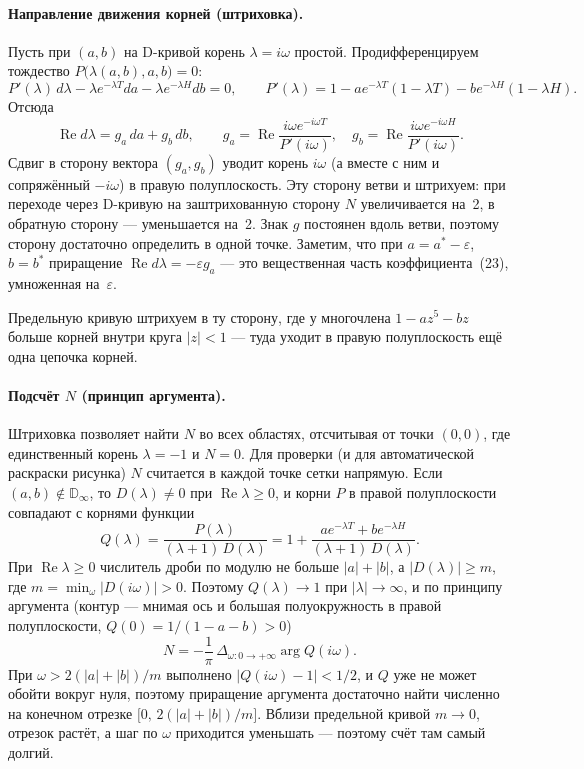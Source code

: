 \paragraph{Направление движения корней (штриховка).}
Пусть при $(a, b)$ на D-кривой корень $\lambda = i\omega$ простой. Продифференцируем тождество
$P\bigl(\lambda(a, b), a, b\bigr) = 0$:
\[
    P'(\lambda)\,d\lambda - \lambda e^{-\lambda T} da - \lambda e^{-\lambda H} db = 0,
    \qquad
    P'(\lambda) = 1 - a e^{-\lambda T}(1 - \lambda T) - b e^{-\lambda H}(1 - \lambda H).
\]
Отсюда
\[
    \operatorname{Re} d\lambda = g_a\,da + g_b\,db, \qquad
    g_a = \operatorname{Re}\frac{i\omega e^{-i\omega T}}{P'(i\omega)}, \quad
    g_b = \operatorname{Re}\frac{i\omega e^{-i\omega H}}{P'(i\omega)}.
\]
Сдвиг в сторону вектора $(g_a, g_b)$ уводит корень $i\omega$ (а вместе с ним и сопряжённый $-i\omega$)
в правую полуплоскость. Эту сторону ветви и штрихуем: при переходе через D-кривую на заштрихованную сторону
$N$ увеличивается на~2, в обратную сторону --- уменьшается на~2. Знак $g$ постоянен вдоль ветви,
поэтому сторону достаточно определить в одной точке. Заметим, что при $a = a^* - \varepsilon$, $b = b^*$
приращение $\operatorname{Re} d\lambda = -\varepsilon g_a$ --- это вещественная часть коэффициента~(23),
умноженная на~$\varepsilon$.

Предельную кривую штрихуем в ту сторону, где у многочлена $1 - a z^5 - b z$ больше корней внутри круга
$|z| < 1$ --- туда уходит в правую полуплоскость ещё одна цепочка корней.

\paragraph{Подсчёт $N$ (принцип аргумента).}
Штриховка позволяет найти $N$ во всех областях, отсчитывая от точки $(0, 0)$, где единственный корень
$\lambda = -1$ и $N = 0$. Для проверки (и для автоматической раскраски рисунка) $N$ считается в каждой точке сетки
напрямую. Если $(a, b) \notin \mathbb{D}_\infty$, то $D(\lambda) \ne 0$ при $\operatorname{Re}\lambda \ge 0$,
и корни $P$ в правой полуплоскости совпадают с корнями функции
\[
    Q(\lambda) = \frac{P(\lambda)}{(\lambda + 1)\,D(\lambda)}
    = 1 + \frac{a e^{-\lambda T} + b e^{-\lambda H}}{(\lambda + 1)\,D(\lambda)}.
\]
При $\operatorname{Re}\lambda \ge 0$ числитель дроби по модулю не больше $|a| + |b|$, а $|D(\lambda)| \ge m$,
где $m = \min_\omega |D(i\omega)| > 0$. Поэтому $Q(\lambda) \to 1$ при $|\lambda| \to \infty$, и по принципу
аргумента (контур --- мнимая ось и большая полуокружность в правой полуплоскости, $Q(0) = 1/(1 - a - b) > 0$)
\[
    N = -\frac{1}{\pi}\,\Delta_{\omega: 0 \to +\infty} \arg Q(i\omega).
\]
При $\omega > 2(|a| + |b|)/m$ выполнено $|Q(i\omega) - 1| < 1/2$, и $Q$ уже не может обойти вокруг нуля,
поэтому приращение аргумента достаточно найти численно на конечном отрезке $\bigl[0,\, 2(|a| + |b|)/m\bigr]$.
Вблизи предельной кривой $m \to 0$, отрезок растёт, а шаг по $\omega$ приходится уменьшать --- поэтому
счёт там самый долгий.

